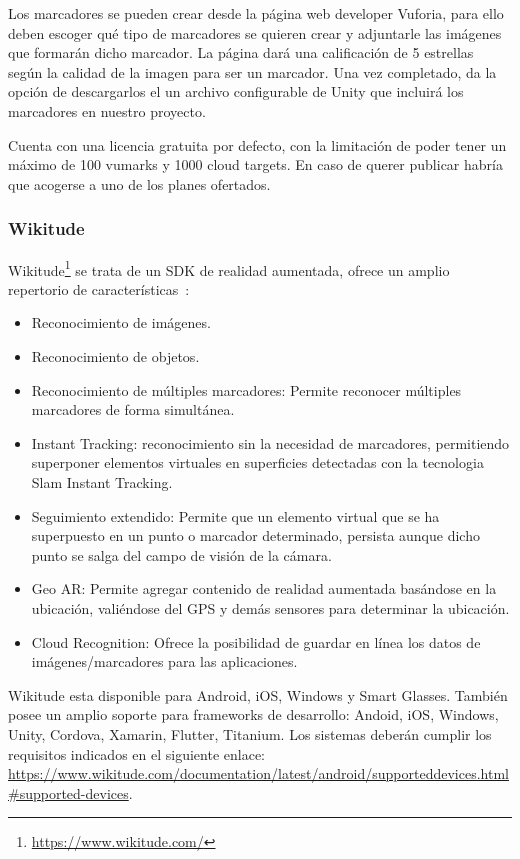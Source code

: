 Los marcadores se pueden crear desde la página web developer Vuforia, para ello deben escoger qué tipo de marcadores se quieren crear y adjuntarle las imágenes que formarán dicho marcador. La página dará una calificación de 5 estrellas según la calidad de la imagen para ser un marcador. Una vez completado, da la opción de descargarlos el un archivo configurable de Unity que incluirá los marcadores en nuestro proyecto.



Cuenta con una licencia gratuita por defecto, con la limitación de poder tener un máximo de 100 vumarks y 1000 cloud targets. En caso de querer publicar habría que acogerse a uno de los planes ofertados. 



\subsubsection{Wikitude}

Wikitude\footnote{\url{https://www.wikitude.com/}} se trata de un SDK de realidad aumentada, ofrece un amplio repertorio de características~\cite{wikitude}: 

\begin{itemize}
	\item Reconocimiento de imágenes.
	\item Reconocimiento de objetos.
	\item Reconocimiento de múltiples marcadores: Permite reconocer múltiples marcadores de forma simultánea.
	\item Instant Tracking: reconocimiento sin la necesidad de marcadores, permitiendo superponer elementos virtuales en superficies detectadas con la tecnologia Slam Instant Tracking.	
	\item Seguimiento extendido: Permite que un elemento virtual que se ha superpuesto en un punto o marcador determinado, persista aunque dicho punto se salga del campo de visión de la cámara.	
	\item Geo AR: Permite agregar contenido de realidad aumentada basándose en la ubicación, valiéndose del GPS y demás sensores para determinar la ubicación.
	\item Cloud Recognition: Ofrece la posibilidad de guardar en línea los datos de imágenes/marcadores para las aplicaciones.	
\end{itemize}

Wikitude esta disponible para Android, iOS, Windows y Smart Glasses.
También posee un amplio soporte para frameworks de desarrollo: Andoid, iOS, Windows, Unity, Cordova, Xamarin, Flutter, Titanium. 
Los sistemas deberán cumplir los requisitos indicados en el siguiente enlace: \url{https://www.wikitude.com/documentation/latest/android/supporteddevices.html#supported-devices}.



